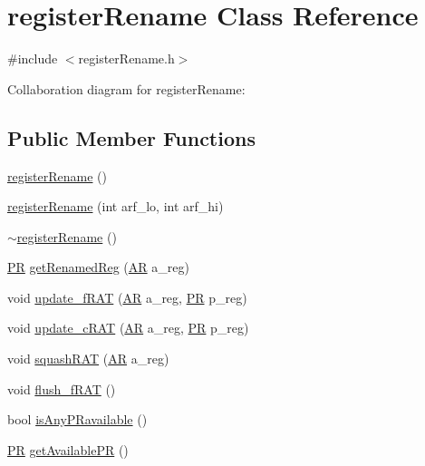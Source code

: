 \hypertarget{classregisterRename}{
\section{registerRename Class Reference}
\label{classregisterRename}
}


{\ttfamily \#include $<$registerRename.h$>$}



Collaboration diagram for registerRename:
\subsection*{Public Member Functions}
\begin{DoxyCompactItemize}
\item 
\hyperlink{classregisterRename_a95ee892e2c48b4a95175cddf7729f4fd}{registerRename} ()
\item 
\hyperlink{classregisterRename_a36b9a5a837c46fc2a9b4b23752047139}{registerRename} (int arf\_\-lo, int arf\_\-hi)
\item 
\hyperlink{classregisterRename_a04cc5008f41dedc944f53c9e5a482b12}{$\sim$registerRename} ()
\item 
\hyperlink{global_2global_8h_a54dcae2ba04c76c12afe113b706bd4dc}{PR} \hyperlink{classregisterRename_a0c6a47ff2437f76f6577609ebea23ce8}{getRenamedReg} (\hyperlink{global_2global_8h_a735ca3cb7fa17e60af6701a846722516}{AR} a\_\-reg)
\item 
void \hyperlink{classregisterRename_a28a11ff6b483aba951f8a88280a8695d}{update\_\-fRAT} (\hyperlink{global_2global_8h_a735ca3cb7fa17e60af6701a846722516}{AR} a\_\-reg, \hyperlink{global_2global_8h_a54dcae2ba04c76c12afe113b706bd4dc}{PR} p\_\-reg)
\item 
void \hyperlink{classregisterRename_ae45ea1c346f9d31c032672f18123e7b8}{update\_\-cRAT} (\hyperlink{global_2global_8h_a735ca3cb7fa17e60af6701a846722516}{AR} a\_\-reg, \hyperlink{global_2global_8h_a54dcae2ba04c76c12afe113b706bd4dc}{PR} p\_\-reg)
\item 
void \hyperlink{classregisterRename_afd0ae2c9363f1f9067da25ef2ff03001}{squashRAT} (\hyperlink{global_2global_8h_a735ca3cb7fa17e60af6701a846722516}{AR} a\_\-reg)
\item 
void \hyperlink{classregisterRename_a6784336e03b69e69d69de839a0ab1b07}{flush\_\-fRAT} ()
\item 
bool \hyperlink{classregisterRename_ae0834c228a3bf0f44ca603556b583046}{isAnyPRavailable} ()
\item 
\hyperlink{global_2global_8h_a54dcae2ba04c76c12afe113b706bd4dc}{PR} \hyperlink{classregisterRename_a7770265e6fed2584304a0d80f35efa04}{getAvailablePR} ()

\end{DoxyCompactItemize}
